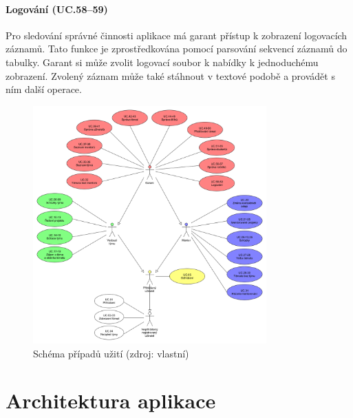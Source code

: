 \documentclass[czech,BP]{thesiskiv}
\begin{document}
			\subsubsection{Logování (UC.58--59)}
			\par Pro sledování správné činnosti aplikace má garant přístup k zobrazení logovacích záznamů. Tato funkce je zprostředkována pomocí parsování sekvencí záznamů do tabulky. Garant si může zvolit logovací soubor k nabídky k jednoduchému zobrazení. Zvolený záznam může také stáhnout v textové podobě a provádět s ním další operace.
		\begin{figure}[h]
			\centering
			\includegraphics[width=0.8\textwidth]{img/use_case/use_case_diagram}
			\caption{Schéma případů užití (zdroj: vlastní)}
			\label{fig:use-case}
		\end{figure}
	\chapter{Architektura aplikace}
\end{document}
